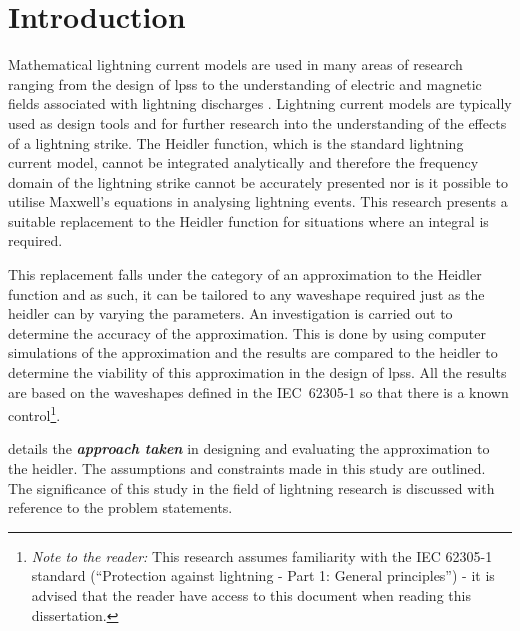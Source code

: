 
\chapter{Introduction} %

\label{ChapterIntro} %


Mathematical lightning current models are used in many areas of research ranging from the design of \glspl{lps} to the understanding of electric and magnetic fields associated with lightning discharges \cite{IEC623051, ZhangFeizhouandLiuShanghe2002}.
Lightning current models are typically used as design tools and for further research into the understanding of the effects of a lightning strike.
The Heidler function, which is the standard lightning current model, cannot be integrated analytically and therefore the frequency domain of the lightning strike cannot be accurately presented nor is it possible to utilise Maxwell's equations in analysing lightning events. This research presents a suitable replacement to the Heidler function for situations where an integral is required.

This replacement falls under the category of an approximation to the Heidler function and as such, it can be tailored to any waveshape required just as the \gls{heidler} can by varying the parameters.
An investigation is carried out to determine the accuracy of the approximation. This is done by using computer simulations of the approximation and the results are compared to the \gls{heidler} to determine the viability of this approximation in the design of \glspl{lps}. All the results are based on the waveshapes defined in the IEC~62305-1 so that there is a known control\footnote{\textit{Note to the reader:} This research assumes familiarity with the IEC 62305-1 standard (``Protection against lightning - Part 1: General principles'') - it is advised that the reader have access to this document when reading this dissertation.}.

 details the \textbf{\textit{approach taken}} in designing and evaluating the approximation to the \gls{heidler}. The assumptions and constraints made in this study are outlined. The significance of this study in the field of lightning research is discussed with reference to the problem statements.


